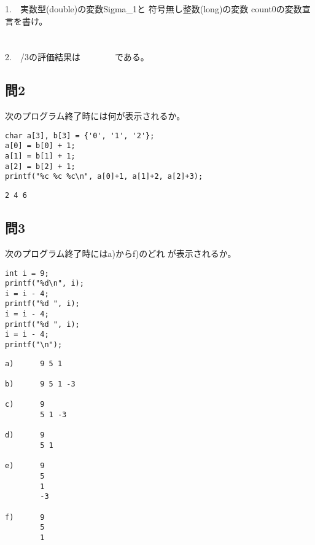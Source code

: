 \documentclass[a4j]{jarticle}
\begin{document}
\begin{multicols*}{2}
%
%



1.　実数型({\ttfamily double})の変数{\ttfamily Sigma\_1}と
符号無し整数({\ttfamily long})の変数
{\ttfamily count0}の変数宣言を書け。\\
\\
\\


2.　{/3}の評価結果は　　　　である。







\subsection*{問2}

次のプログラム終了時には何が表示されるか。
\begin{verbatim}
char a[3], b[3] = {'0', '1', '2'};
a[0] = b[0] + 1;
a[1] = b[1] + 1;
a[2] = b[2] + 1;
printf("%c %c %c\n", a[0]+1, a[1]+2, a[2]+3);
\end{verbatim}


\ifnum {}
\vspace*{1cm}
\else
\begin{verbatim}
2 4 6
\end{verbatim}
\fi






\subsection*{問3}



次のプログラム終了時には{\ttfamily a)}から{\ttfamily f)}のどれ
が表示されるか。
\begin{verbatim}
int i = 9;
printf("%d\n", i);
i = i - 4;
printf("%d ", i);
i = i - 4;
printf("%d ", i);
i = i - 4;
printf("\n");
\end{verbatim}

\begin{verbatim}
a)      9 5 1

b)      9 5 1 -3

c)      9
        5 1 -3

d)      9
        5 1

e)      9
        5
        1
        -3

f)      9
        5
        1
\end{verbatim}







\end{multicols*}
\end{document}
